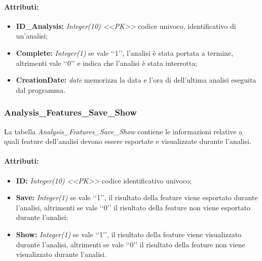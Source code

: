 \paragraph{Attributi:}
\begin{itemize}
\item \textbf{ID\_Analysis:} \emph{Integer(10) <<PK>>} codice univoco, identificativo di un'analisi;
\item \textbf{Complete:} \emph{Integer(1)} se vale \lq\lq{}1\rq\rq{}, l'analisi è stata portata a termine, altrimenti vale \lq\lq{}0\rq\rq{} e indica che l'analisi è stata interrotta;
\item \textbf{CreationDate:} \emph{date} memorizza la data e l'ora di dell'ultima analisi eseguita dal programma.
\end{itemize}

\subsubsection{Analysis\_Features\_Save\_Show}
\label{DBAnFeSaSh}
La tabella \textit{Analysis\_Features\_Save\_Show} contiene le informazioni relative a quali feature\glossario{} dell'analisi devono essere esportate e visualizzate durante l'analisi.
\paragraph{Attributi:}
\begin{itemize}
\item \textbf{ID:} \emph{Integer(10) <<PK>>} codice identificativo univoco;
\item \textbf{Save:} \emph{Integer(1)} se vale \lq\lq{}1\rq\rq{}, il risultato della feature\glossario{} viene esportato durante l'analisi, altrimenti se vale \lq\lq{}0\rq\rq{} il risultato della feature\glossario{} non viene esportato durante l'analisi;
\item \textbf{Show:} \emph{Integer(1)} se vale \lq\lq{}1\rq\rq{}, il risultato della feature\glossario{} viene visualizzato durante l'analisi, altrimenti se vale \lq\lq{}0\rq\rq{} il risultato della feature\glossario{} non viene visualizzato durante l'analisi.
\end{itemize}

